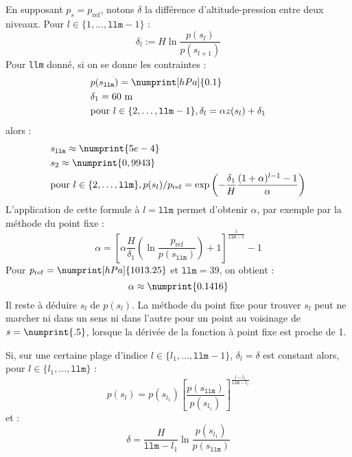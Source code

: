 \documentclass[a4paper,french]{article}
\begin{document}
En supposant $p_s = p_\mathrm{ref}$, notons $\delta$ la différence
d'altitude-pression entre deux niveaux. Pour $l \in \{1, \dots,
\mathtt{llm} - 1\}$ :
\begin{equation*}
  \delta_l := H \ln \frac{p(s_l)}{p(s_{l+1})}
\end{equation*}
Pour \verb+llm+ donné, si on se donne les contraintes :
\begin{align*}
  & p(s_\mathtt{llm}) = \numprint[hPa]{0.1} \\
  & \delta_1 = 60\ \mathrm{m} \\
  & \textrm{pour } l \in \{2, \dots, \mathtt{llm} - 1\},
  \delta_l = \alpha z(s_l) + \delta_1
\end{align*}
alors :
\begin{align*}
  & s_\mathtt{llm} \approx \numprint{5e-4} \\
  & s_2 \approx \numprint{0,9943} \\
  & \textrm{pour } l \in \{2, \dots, \mathtt{llm}\},
  p(s_l) / p_\mathrm{ref}
  = \exp\left(- \frac{\delta_1}{H} \frac{(1 + \alpha)^{l - 1} - 1}{\alpha}\right)
\end{align*}
L'application de cette formule à $l = \mathtt{llm}$ permet d'obtenir
$\alpha$, par exemple par la méthode du point fixe :
\begin{equation*}
  \alpha
  =
  \left[
    \alpha \frac{H}{\delta_1}
    \left(\ln \frac{p_\mathrm{ref}}{p(s_\mathtt{llm})}\right) + 1
  \right]
  ^{\frac{1}{\mathtt{llm} - 1}}
  - 1
\end{equation*}
Pour $p_\mathrm{ref} = \numprint[hPa]{1013.25}$ et $\mathtt{llm} =
39$, on obtient :
\begin{equation*}
  \alpha \approx \numprint{0.1416}
\end{equation*}
Il reste à déduire $s_l$ de $p(s_l)$. La méthode du point fixe pour
trouver $s_l$ peut ne marcher ni dans un sens ni dans l'autre pour un
point au voisinage de $s = \numprint{.5}$, lorsque la dérivée de la
fonction à point fixe est proche de 1.

Si, sur une certaine plage d'indice $l \in \{l_1, \dots, \mathtt{llm}
- 1\}$, $\delta_l = \delta$ est constant alors, pour $l \in \{l_1,
\dots, \mathtt{llm}\}$ :
\begin{displaymath}
  p(s_l)
  = p(s_{l_1}) \left[ \frac{p(s_\mathtt{llm})}{p(s_{l_1})} \right]
    ^{\frac{l - l_1}{\mathtt{llm} - l_1}}
\end{displaymath}
et :
\begin{displaymath}
  \delta = \frac{H}{\mathtt{llm} - l_1} \ln \frac{p(s_{l_1})}{p(s_\mathtt{llm})}
\end{displaymath}
\end{document}
